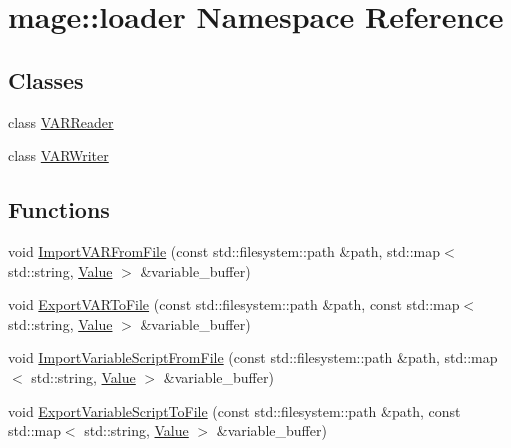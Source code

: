 \hypertarget{namespacemage_1_1loader}{}\section{mage\+:\+:loader Namespace Reference}
\label{namespacemage_1_1loader}
\subsection*{Classes}
\begin{DoxyCompactItemize}
\item 
class \mbox{\hyperlink{classmage_1_1loader_1_1_v_a_r_reader}{V\+A\+R\+Reader}}
\item 
class \mbox{\hyperlink{classmage_1_1loader_1_1_v_a_r_writer}{V\+A\+R\+Writer}}
\end{DoxyCompactItemize}
\subsection*{Functions}
\begin{DoxyCompactItemize}
\item 
void \mbox{\hyperlink{namespacemage_1_1loader_a761f6907eb7daf04d1461811616db1f3}{Import\+V\+A\+R\+From\+File}} (const std\+::filesystem\+::path \&path, std\+::map$<$ std\+::string, \mbox{\hyperlink{namespacemage_a68ae02d3a746ed2f285aa2b10f131a21}{Value}} $>$ \&variable\+\_\+buffer)
\item 
void \mbox{\hyperlink{namespacemage_1_1loader_a8373cd8901715a2331fcd8f8a71df554}{Export\+V\+A\+R\+To\+File}} (const std\+::filesystem\+::path \&path, const std\+::map$<$ std\+::string, \mbox{\hyperlink{namespacemage_a68ae02d3a746ed2f285aa2b10f131a21}{Value}} $>$ \&variable\+\_\+buffer)
\item 
void \mbox{\hyperlink{namespacemage_1_1loader_aa25cf60b0951e7ac3f71415e1df5ac4c}{Import\+Variable\+Script\+From\+File}} (const std\+::filesystem\+::path \&path, std\+::map$<$ std\+::string, \mbox{\hyperlink{namespacemage_a68ae02d3a746ed2f285aa2b10f131a21}{Value}} $>$ \&variable\+\_\+buffer)
\item 
void \mbox{\hyperlink{namespacemage_1_1loader_a7a50ce12e6a17de1f5db8d59ced5bc0f}{Export\+Variable\+Script\+To\+File}} (const std\+::filesystem\+::path \&path, const std\+::map$<$ std\+::string, \mbox{\hyperlink{namespacemage_a68ae02d3a746ed2f285aa2b10f131a21}{Value}} $>$ \&variable\+\_\+buffer)
\end{DoxyCompactItemize}
